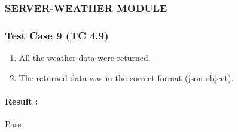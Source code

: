 \subsubsection*{SERVER-WEATHER MODULE}

\subsubsection{Test Case 9 (TC 4.9)}

\begin{enumerate}
	\item All the weather data were returned.
	\item The returned data was in the correct format (json object).
\end{enumerate}

\paragraph{Result :} Pass
